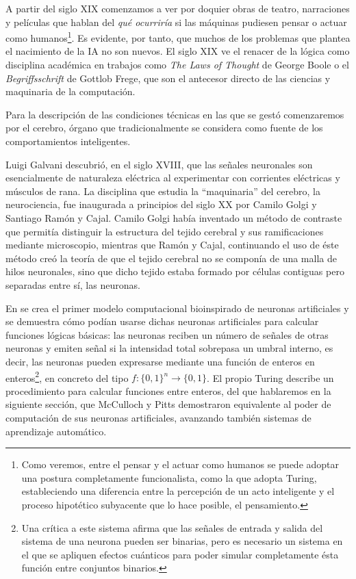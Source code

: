 \documentclass[12pt]{memoir}
\begin{document}
A partir del siglo XIX comenzamos a ver por doquier obras de teatro, narraciones y películas que hablan del \textit{qué ocurriría} si las máquinas pudiesen pensar o actuar como humanos\footnote{Como veremos, entre el pensar y el actuar como humanos se puede adoptar una postura completamente funcionalista, como la que adopta Turing, estableciendo una diferencia entre la percepción de un acto inteligente y el proceso hipotético subyacente que lo hace posible, el pensamiento.}. Es evidente, por tanto, que muchos de los problemas que plantea el nacimiento de la IA no son nuevos. El siglo XIX ve el renacer de la lógica como disciplina académica en trabajos como \textit{The Laws of Thought} de George Boole o el \textit{Begriffsschrift} de Gottlob Frege, que son el antecesor directo de las ciencias y maquinaria de la computación.

Para la descripción de las condiciones técnicas en las que se gestó \parencite{Turing1950cmi} comenzaremos por el cerebro, órgano que tradicionalmente se considera como fuente de los comportamientos inteligentes. 

Luigi Galvani descubrió, en el siglo XVIII, que las señales neuronales son esencialmente de naturaleza eléctrica al experimentar con corrientes eléctricas y músculos de rana. La disciplina que estudia la ``maquinaria'' del cerebro, la neurociencia, fue inaugurada a principios del siglo XX por Camilo Golgi y Santiago Ramón y Cajal. Camilo Golgi había inventado un método de contraste que permitía distinguir la estructura del tejido cerebral y sus ramificaciones mediante microscopio, mientras que Ramón y Cajal, continuando el uso de éste método creó la teoría de que el tejido cerebral no se componía de una malla de hilos neuronales, sino que dicho tejido estaba formado por células contiguas pero separadas entre sí, las neuronas. 

En \parencite{mcCullochPitts} se crea el primer modelo computacional bioinspirado de neuronas artificiales  y se demuestra cómo podían usarse dichas neuronas artificiales para calcular funciones lógicas básicas: las neuronas reciben un número de señales de otras neuronas y emiten señal si la intensidad total sobrepasa un umbral interno, es decir, las neuronas pueden expresarse mediante una función de enteros en enteros\footnote{Una crítica a este sistema \parencite{newmind} afirma que las señales de entrada y salida del sistema de una neurona pueden ser binarias, pero es necesario un sistema en el que se apliquen efectos cuánticos para poder simular completamente ésta función entre conjuntos binarios.}, en concreto del tipo $f: \lbrace 0, 1\rbrace^n \rightarrow \lbrace 0, 1\rbrace$. El propio Turing \parencite{turingComputableNumbers} describe un procedimiento para calcular funciones entre enteros, del que hablaremos en la siguiente sección, que McCulloch y Pitts demostraron equivalente al poder de computación de sus neuronas artificiales, avanzando también sistemas de aprendizaje automático.
\end{document}
